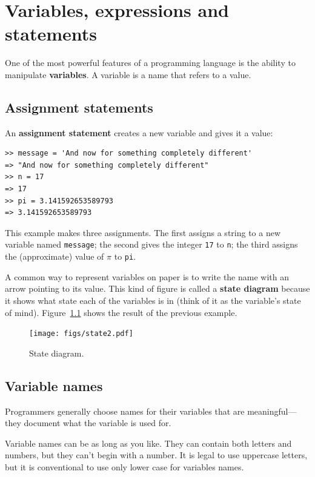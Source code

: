\documentclass[10pt]{book}
\begin{document}
\chapter{Variables, expressions and statements}

One of the most powerful features of a programming language is the
ability to manipulate {\bf variables}.  A variable is a name that
refers to a value.


\section{Assignment statements}
\label{variables}

An {\bf assignment statement} creates a new variable and gives
it a value:

\begin{verbatim}
>> message = 'And now for something completely different'
=> "And now for something completely different"
>> n = 17
=> 17
>> pi = 3.141592653589793
=> 3.141592653589793
\end{verbatim}
%
This example makes three assignments.  The first assigns a string
to a new variable named {\tt message};
the second gives the integer {\tt 17} to {\tt n}; the third
assigns the (approximate) value of $\pi$ to {\tt pi}.

A common way to represent variables on paper is to write the name with
an arrow pointing to its value.  This kind of figure is
called a {\bf state diagram} because it shows what state each of the
variables is in (think of it as the variable's state of mind).
Figure~\ref{fig.state2} shows the result of the previous example.

\begin{figure}
\centerline
{\texttt{[image: figs/state2.pdf]}}
\caption{State diagram.}
\label{fig.state2}
\end{figure}



\section{Variable names}

Programmers generally choose names for their variables that
are meaningful---they document what the variable is used for.

Variable names can be as long as you like.  They can contain
both letters and numbers, but they can't begin with a number.
It is legal to use uppercase letters, but it is conventional
to use only lower case for variables names.
\end{document}
